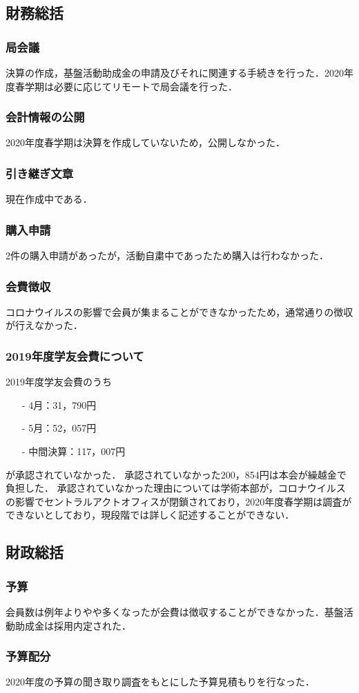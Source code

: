 \subsection*{財務総括}


\subsubsection*{局会議}
決算の作成，基盤活動助成金の申請及びそれに関連する手続きを行った．2020年度春学期は必要に応じてリモートで局会議を行った．

\subsubsection*{会計情報の公開}
2020年度春学期は決算を作成していないため，公開しなかった．

\subsubsection*{引き継ぎ文章}
現在作成中である．

\subsubsection*{購入申請}
2件の購入申請があったが，活動自粛中であったため購入は行わなかった．

\subsubsection*{会費徴収}
コロナウイルスの影響で会員が集まることができなかったため，通常通りの徴収が行えなかった．

\subsubsection*{2019年度学友会費について}
2019年度学友会費のうち
\begin{itemize}
	\item[-]4月：31，790円
	\item[-]5月：52，057円
	\item[-]中間決算：117，007円
\end{itemize}
が承認されていなかった．
承認されていなかった200，854円は本会が繰越金で負担した．
承認されていなかった理由については学術本部が，コロナウイルスの影響でセントラルアクトオフィスが閉鎖されており，2020年度春学期は調査ができないとしており，現段階では詳しく記述することができない．


\subsection*{財政総括}


\subsubsection*{予算}
会員数は例年よりやや多くなったが会費は徴収することができなかった．基盤活動助成金は採用内定された．

\subsubsection*{予算配分}
2020年度の予算の聞き取り調査をもとにした予算見積もりを行なった．